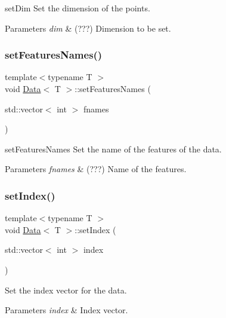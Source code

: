 set\+Dim Set the dimension of the points. 


\begin{DoxyParams}{Parameters}
{\em dim} & (???) Dimension to be set. \\
\hline
\end{DoxyParams}
\mbox{\label{class_data_a3b22a1e56ab54ca6ecd84bef0ad968cc}} 
\subsubsection{\texorpdfstring{set\+Features\+Names()}{setFeaturesNames()}}
{\footnotesize\ttfamily template$<$typename T $>$ \\
void \hyperlink{class_data}{Data}$<$ T $>$\+::set\+Features\+Names (\begin{DoxyParamCaption}\item[{std\+::vector$<$ int $>$}]{fnames }\end{DoxyParamCaption})}



set\+Features\+Names Set the name of the features of the data. 


\begin{DoxyParams}{Parameters}
{\em fnames} & (???) Name of the features. \\
\hline
\end{DoxyParams}
\mbox{\label{class_data_a3e03ebfa95d7d90d4ee3b024af7b18de}} 
\subsubsection{\texorpdfstring{set\+Index()}{setIndex()}}
{\footnotesize\ttfamily template$<$typename T $>$ \\
void \hyperlink{class_data}{Data}$<$ T $>$\+::set\+Index (\begin{DoxyParamCaption}\item[{std\+::vector$<$ int $>$}]{index }\end{DoxyParamCaption})}



Set the index vector for the data. 


\begin{DoxyParams}{Parameters}
{\em index} & Index vector. \\
\hline
\end{DoxyParams}
\mbox{\label{class_data_ade1a5caf2f463a894e1d348f728b56cf}} 

